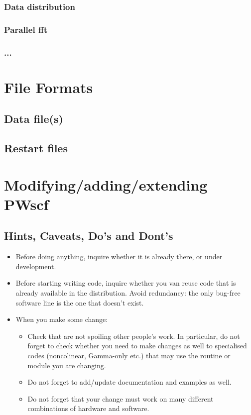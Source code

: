 \documentclass[12pt,a4paper]{article}
\begin{document}
\subsubsection{Data distribution}
\subsubsection{Parallel fft}
\subsubsection{...}

\section{File Formats}
\subsection{Data file(s)}
\subsection{Restart files}

\section{Modifying/adding/extending PWscf}
\subsection{Hints, Caveats, Do's and Dont's}
\begin{itemize}
\item
Before doing anything, inquire whether it is already there,
or under development.
\item 
Before starting writing code, inquire whether you van reuse
code that is already available in the distribution. Avoid 
redundancy: the only bug-free software line is the one that 
doesn't exist.
\item When you make some change:
\begin{itemize}
\item Check that are not spoiling other people's work.
In particular, do not forget to check whether you need to make changes 
as well to specialised codes (noncolinear, Gamma-only etc.) that may
use the routine or module you are changing.
\item Do not forget to add/update documentation and examples as well.
\item Do not forget that your change must work on many different 
combinations of hardware and software.
\end{itemize}
\end{itemize}
\end{document}

